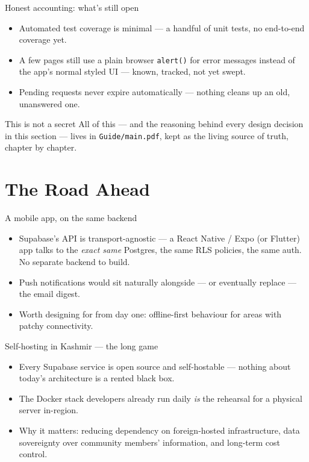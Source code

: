 \documentclass[aspectratio=169,11pt]{beamer}
\newcommand{\code}[1]{\textcolor{olkTealDark}{\texttt{#1}}}
\begin{document}
\begin{frame}{Honest accounting: what's still open}
  \begin{itemize}
    \item Automated test coverage is minimal --- a handful of unit tests, no end-to-end coverage yet.
    \item A few pages still use a plain browser \code{alert()} for error messages instead of the app's normal styled UI --- known, tracked, not yet swept.
    \item Pending requests never expire automatically --- nothing cleans up an old, unanswered one.
  \end{itemize}
  \vfill
  \begin{block}{This is not a secret}
    All of this --- and the reasoning behind every design decision in this section --- lives in \code{Guide/main.pdf}, kept as the living source of truth, chapter by chapter.
  \end{block}
\end{frame}

\section{The Road Ahead}

\begin{frame}{A mobile app, on the same backend}
  \begin{itemize}
    \item Supabase's API is transport-agnostic --- a React Native / Expo (or Flutter) app talks to the \emph{exact same} Postgres, the same RLS policies, the same auth. No separate backend to build.
    \item Push notifications would sit naturally alongside --- or eventually replace --- the email digest.
    \item Worth designing for from day one: offline-first behaviour for areas with patchy connectivity.
  \end{itemize}
\end{frame}

\begin{frame}{Self-hosting in Kashmir --- the long game}
  \begin{itemize}
    \item Every Supabase service is open source and self-hostable --- nothing about today's architecture is a rented black box.
    \item The Docker stack developers already run daily \emph{is} the rehearsal for a physical server in-region.
    \item Why it matters: reducing dependency on foreign-hosted infrastructure, data sovereignty over community members' information, and long-term cost control.
  \end{itemize}
\end{frame}
\end{document}

